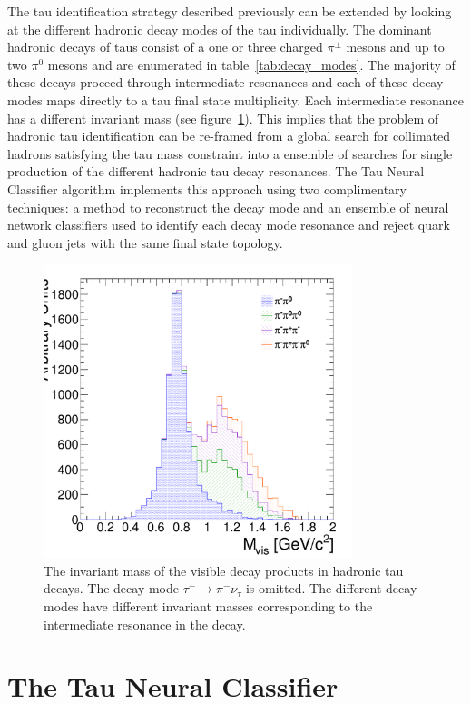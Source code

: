The tau identification strategy described previously can be extended by
looking at the different hadronic decay modes of the tau individually.
The dominant hadronic decays of taus consist of a one or three charged
$\pi^{\pm}$ mesons and up to two $\pi^0$ mesons and are enumerated in
table~\ref{tab:decay_modes}.  The majority of these decays proceed through
intermediate resonances and each of these decay modes maps directly to a tau
final state multiplicity. Each intermediate resonance has a different invariant
mass (see figure~\ref{fig:trueInvMass}).  This implies that the problem of
hadronic tau identification can be re-framed from a global search for
collimated hadrons satisfying the tau mass constraint into a ensemble of
searches for single production of the different hadronic tau decay resonances.
The Tau Neural Classifier algorithm implements this approach using two
complimentary techniques: a method to reconstruct the decay mode and an
ensemble of neural network classifiers used to identify each decay mode
resonance and reject quark and gluon jets with the same final state topology.

\begin{figure}[thbp]
   \begin{center}
     \includegraphics[width=90mm]{tanc_chapter/figures/truthIMvsDM.pdf}
   \end{center}
   \caption{The invariant mass of the visible decay products in hadronic tau
   decays.  The decay mode $\tau^{-} \to \pi^{-} \nu_\tau$ is omitted.
   The different decay modes have different invariant masses corresponding to
   the intermediate resonance in the decay.}
   \label{fig:trueInvMass}
\end{figure}

\section{The Tau Neural Classifier}

